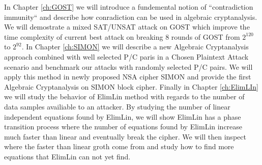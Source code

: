 In Chapter \ref{ch:GOST} we will introduce a fundemental notion of ``contradiction immunity`` and describe how conradiction can be used in algebraic cryptanalysis. We will demostrate a mixed SAT/UNSAT attack on GOST which improve the time complexity of current best attack on breaking 8 rounds of GOST from $2^{120}$ to $2^{92}$. In Chapter \ref{ch:SIMON} we will describe a new Algebraic Cryptanalysis approach combined with well selected P/C paris in a Chosen Plaintext Attack scenario and benchmark our attacks with randomly selected P/C pairs. We will apply this method in newly proposed NSA cipher SIMON and provide the first Algebraic Cryptanalysis on SIMON block cipher. Finally in Chapter \ref{ch:ElimLIn} we will study the behavior of ElimLin method with regards to the number of data samples availiable to an attacker. By studying the number of linear independent equations found by ElimLin, we will show ElimLin has a phase transition process where the number of equations found by ElimLin increase much faster than linear and eventually break the cipher. We will then inspect where the faster than linear groth come from and study how to find more equations that ElimLin can not yet find.

